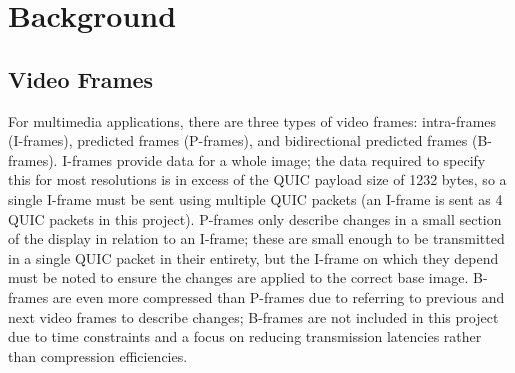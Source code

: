 \documentclass{mpaper}
\begin{document}
%
%
\section{Background}


\subsection{Video Frames} 
For multimedia applications, there are three types of video frames: intra-frames (I-frames), predicted frames (P-frames), and bidirectional predicted frames (B-frames). I-frames provide data for a whole image; the data required to specify this for most resolutions is in excess of the QUIC payload size of 1232 bytes, so a single I-frame must be sent using multiple QUIC packets (an I-frame is sent as 4 QUIC packets in this project). P-frames only describe changes in a small section of the display in relation to an I-frame; these are small enough to be transmitted in a single QUIC packet in their entirety, but the I-frame on which they depend must be noted to ensure the changes are applied to the correct base image. B-frames are even more compressed than P-frames due to referring to previous and next video frames to describe changes; B-frames are not included in this project due to time constraints and a focus on reducing transmission latencies rather than compression efficiencies.
\end{document}
